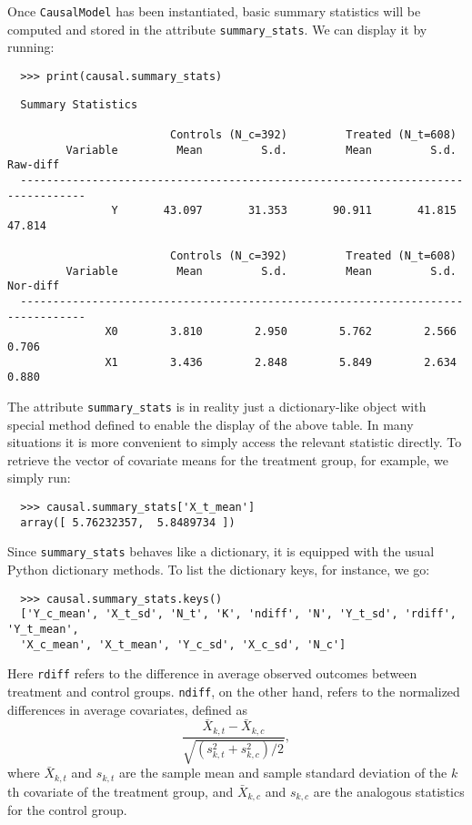 \documentclass[12pt]{article}
\theoremstyle{definition}
\theoremstyle{definition}
\theoremstyle{definition}
\theoremstyle{remark}
\begin{document}
Once \texttt{CausalModel} has been instantiated, basic summary statistics will be computed and stored in the attribute \texttt{summary\_stats}. We can display it by running:
\begin{verbatim}
  >>> print(causal.summary_stats)
\end{verbatim}
\begin{verbatim}
  Summary Statistics
  
                         Controls (N_c=392)         Treated (N_t=608)             
         Variable         Mean         S.d.         Mean         S.d.     Raw-diff
  --------------------------------------------------------------------------------
                Y       43.097       31.353       90.911       41.815       47.814
  
                         Controls (N_c=392)         Treated (N_t=608)             
         Variable         Mean         S.d.         Mean         S.d.     Nor-diff
  --------------------------------------------------------------------------------
               X0        3.810        2.950        5.762        2.566        0.706
               X1        3.436        2.848        5.849        2.634        0.880
\end{verbatim}

The attribute \texttt{summary\_stats} is in reality just a dictionary-like object with special method defined to enable the display of the above table. In many situations it is more convenient to simply access the relevant statistic directly. To retrieve the vector of covariate means for the treatment group, for example, we simply run:
\begin{verbatim}
  >>> causal.summary_stats['X_t_mean']
  array([ 5.76232357,  5.8489734 ])
\end{verbatim}

Since \texttt{summary\_stats} behaves like a dictionary, it is equipped with the usual Python dictionary methods. To list the dictionary keys, for instance, we go:
\begin{verbatim}
  >>> causal.summary_stats.keys()
  ['Y_c_mean', 'X_t_sd', 'N_t', 'K', 'ndiff', 'N', 'Y_t_sd', 'rdiff', 'Y_t_mean',
  'X_c_mean', 'X_t_mean', 'Y_c_sd', 'X_c_sd', 'N_c']
\end{verbatim}

Here \texttt{rdiff} refers to the difference in average observed outcomes between treatment and control groups. \texttt{ndiff}, on the other hand, refers to the normalized differences in average covariates, defined as
\[\frac{\bar{X}_{k,t} - \bar{X}_{k,c}}{\sqrt{\left(s^2_{k,t}+s^2_{k,c}\right)\Big/ 2}},\]
where $\bar{X}_{k,t}$ and $s_{k,t}$ are the sample mean and sample standard deviation of the $k$th covariate of the treatment group, and $\bar{X}_{k,c}$ and $s_{k,c}$ are the analogous statistics for the control group.
\end{document}

